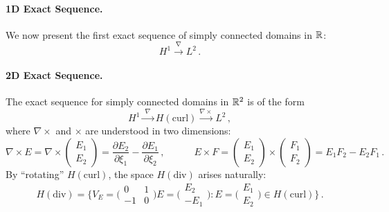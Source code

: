 \paragraph{1D Exact Sequence.} We now present the first exact sequence of simply connected domains in $\mathbb{R}$:
\begin{equation}
H^1 \stackrel{\nabla}{\longrightarrow} L^2\, .
\end{equation}

\paragraph{2D Exact Sequence.} The exact sequence for simply connected domains in $\mathbb{R}^2$ is of the form
\begin{equation}
H^1 \xrightarrow{\,\,\nabla\,\,} H(\mathrm{curl}) \xrightarrow{\nabla\times} L^2 \,,
\label{eq:2DExactSeq}
\end{equation}
where $\nabla\times$ and $\times$ are understood in two dimensions:
\begin{equation}
    \nabla\times E=\nabla\times\begin{pmatrix}E_1\\E_2\end{pmatrix}
        =\frac{\partial E_2}{\partial \xi_1}-\frac{\partial E_1}{\partial \xi_2}\,,\qquad\quad
    E\times F=\begin{pmatrix}E_1\\E_2\end{pmatrix}\times\begin{pmatrix}F_1\\F_2\end{pmatrix}
        =E_1 F_2 - E_2 F_1\,.\label{eq:2Dcurlandcross}
\end{equation}
By ``rotating'' $H(\mathrm{curl})$, the space $H(\mathrm{div})$ arises naturally:
\begin{equation}
    H(\mathrm{div})=\Big\{V_E=\Big(\begin{smallmatrix}0&1\\[2pt]-1&0\end{smallmatrix}\Big)E=
        \Big(\begin{smallmatrix}E_2\\-E_1\end{smallmatrix}\Big):
            E=\Big(\begin{smallmatrix}E_1\\E_2\end{smallmatrix}\Big)\in H(\mathrm{curl})\Big\}\,.
\label{eq:Hdiv2Ddef}
\end{equation}
